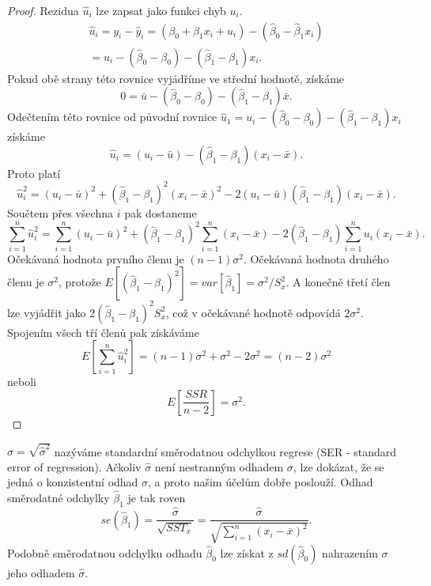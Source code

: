 \begin{proof}
Rezidua $\hat{u}_i$ lze zapsat jako funkci chyb $u_i$.
\begin{multline}
\hat{u}_i = y_i - \hat{y}_i = (\beta_0 + \beta_1 x_i + u_i) - (\hat{\beta}_0 - \hat{\beta}_1x_i)\\
= u_i - (\hat{\beta}_0 - \beta_0) - (\hat{\beta}_1 - \beta_1)x_i.
\end{multline}
Pokud obě strany této rovnice vyjádříme ve střední hodnotě, získáme
\begin{equation}
0 = \bar{u} - (\hat{\beta}_0 - \beta_0) - (\hat{\beta}_1 - \beta_1)\bar{x}.
\end{equation}
Odečtením této rovnice od původní rovnice $\hat{u}_1 = u_i - (\hat{\beta}_0 - \beta_0) - 
(\hat{\beta}_1 - \beta_1)x_i$ získáme
\begin{equation}
\hat{u}_i = (u_i - \bar{u}) - (\hat{\beta}_1 - \beta_1)(x_i - \bar{x}).
\end{equation}
Proto platí
\begin{equation}
\hat{u}_i^2 = (u_i - \bar{u})^2 + (\hat{\beta}_1 - \beta_1)^2(x_i - \bar{x})^2 - 2(u_i - \bar{u})(\hat{\beta}_1 - 
\beta_1)(x_i - \bar{x}).
\end{equation}
Součtem přes všechna $i$ pak dostaneme
\begin{equation}
\sum_{i = 1}^n \hat{u}_i^2 = \sum_{i = 1}^n (u_i - \bar{u})^2 + (\hat{\beta}_1 - \beta_1)^2 \sum_{i = 1}^n (x_i - \bar{x}) - 2(\hat{\beta}_1 - 
\beta_1)\sum_{i = 1}^n u_i(x_i - \bar{x}).
\end{equation}
Očekávaná hodnota prvního členu je $(n - 1)\sigma^2$. Očekávaná hodnota druhého členu je $\sigma^2$, protože 
$E[(\hat{\beta}_1 - \beta_1)^2] = var[\hat{\beta}_1] = \sigma^2/S_x^2$. A konečně třetí 
člen lze vyjádřit jako $2(\hat{\beta}_1 - \beta_1)^2 S_x^2$, což v očekávané hodnotě odpovídá $2\sigma^2$. 
Spojením všech tří členů pak získáváme
\begin{equation}
E\left[\sum_{i = 1}^n \hat{u}_i^2 \right] = (n - 1)\sigma^2 + \sigma^2 - 2 \sigma^2 = (n - 2)\sigma^2
\end{equation}
neboli
\begin{equation}
E\left[\frac{SSR}{n-2}\right] = \sigma^2.
\end{equation}

\raggedleft{$\clubsuit$}
\end{proof}

$\hat{\sigma} = \sqrt{\hat{\sigma}^2}$ nazýváme standardní směrodatnou odchylkou regrese (SER - standard error of 
regression). Ačkoliv $\hat{\sigma}$ není nestranným odhadem $\sigma$, lze dokázat, že se jedná o konzistentní 
odhad $\sigma$, a proto našim účelům dobře poslouží. Odhad směrodatné odchylky $\hat{\beta}_1$ je tak roven
\begin{equation}
se(\hat{\beta}_1) = \frac{\hat{\sigma}}{\sqrt{SST_x}} = \frac{\hat{\sigma}}{\sqrt{\sum_{i = 1}^n (x_i - \bar{x})^2}}.
\end{equation}
Podobně směrodatnou odchylku odhadu $\hat{\beta}_0$ lze získat z $sd(\hat{\beta}_0)$ nahrazením $\sigma$ jeho 
odhadem $\hat{\sigma}$.

